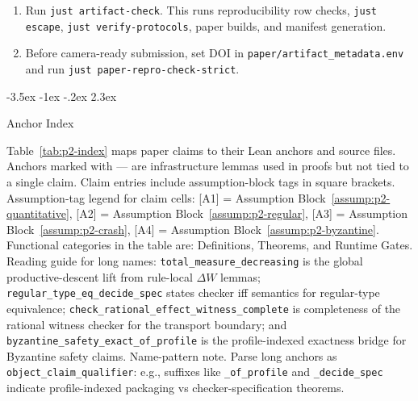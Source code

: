 \documentclass[a4paper,10pt,twocolumn,english]{article}
\makeatletter
\renewcommand{\section}{\@startsection{section}{1}{\z@}%
  {-3.5ex \@plus -1ex \@minus -.2ex}%
  {2.3ex}%
  {\raggedright\normalfont\large\bfseries}}
\numberwithin{equation}{section}
\theoremstyle{paperdef}
\theoremstyle{paperplain}
\theoremstyle{paperdef}
\theoremstyle{paperremark}
\makeatother
\begin{document}
\begin{enumerate}
	\item Run \texttt{just artifact-check}. This runs reproducibility row checks, \texttt{just escape}, \texttt{just verify-protocols}, paper builds, and manifest generation.
	\item Before camera-ready submission, set DOI in \texttt{paper/artifact\_metadata.env} and run \texttt{just paper-repro-check-strict}.
\end{enumerate}

\clearpage
\onecolumn

\section{Anchor Index}
\label{app:index}

Table~\ref{tab:p2-index} maps paper claims to their Lean anchors and source files. Anchors marked with --- are infrastructure lemmas used in proofs but not tied to a single claim. Claim entries include assumption-block tags in square brackets.
Assumption-tag legend for claim cells: [A1] = Assumption
Block~\ref{assump:p2-quantitative}, [A2] = Assumption
Block~\ref{assump:p2-regular}, [A3] = Assumption
Block~\ref{assump:p2-crash}, [A4] = Assumption
Block~\ref{assump:p2-byzantine}.
Functional categories in the table are: Definitions, Theorems, and Runtime
Gates. Reading guide for long names:
\texttt{total\_measure\_decreasing} is the global productive-descent lift from
rule-local $\Delta W$ lemmas; \texttt{regular\_type\_eq\_decide\_spec} states
checker iff semantics for regular-type equivalence;
\texttt{check\_rational\_effect\_witness\_complete} is completeness of the
rational witness checker for the transport boundary; and
\texttt{byzantine\_safety\_exact\_of\_profile} is the profile-indexed exactness
bridge for Byzantine safety claims.
Name-pattern note. Parse long anchors as
\texttt{object\_claim\_qualifier}: e.g., suffixes like
\texttt{\_of\_profile} and \texttt{\_decide\_spec} indicate profile-indexed
packaging vs checker-specification theorems.
\end{document}
